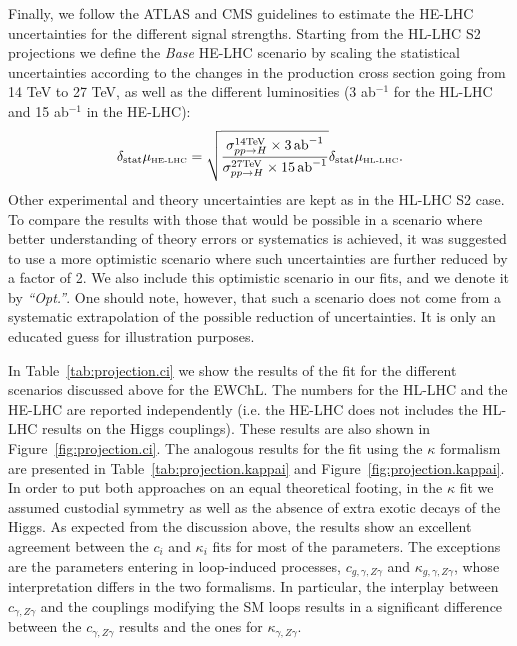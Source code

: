 %
Finally, we follow the ATLAS and CMS guidelines to estimate the HE-LHC uncertainties for the different signal strengths.  
Starting from the HL-LHC S2 projections we define the {\it Base} HE-LHC scenario by scaling the statistical uncertainties according to the changes in the production cross section going from 14 TeV to 27 TeV, as well as the different luminosities (3 ab$^{-1}$ for the HL-LHC and 15 ab$^{-1}$ in the HE-LHC):
%
\begin{equation}
\delta_{\mathrm{stat}} \mu_{\mbox{\tiny HE-LHC}} = \sqrt{\frac{\sigma_{pp\to H}^{\mathrm{14 TeV}}\times 3~\!\mathrm{ab}^{-1}}{\sigma_{pp\to H}^{\mathrm{27 TeV}}\times 15~\! \mathrm{ab}^{-1}}} \delta_{\mathrm{stat}} \mu_{\mbox{\tiny HL-LHC}} .
\end{equation}
%
Other experimental and theory uncertainties are kept as in the HL-LHC S2 case. 
To compare the results with those that would be possible in a scenario where better understanding of theory errors or systematics is achieved, it was suggested to use a more optimistic scenario where such uncertainties are further reduced by a factor of 2. We also include this optimistic scenario in our fits, and we denote it by {\it ``Opt.''}. One should note, however, that such a scenario does not come from a systematic extrapolation of the possible reduction of uncertainties. It is only an educated guess for illustration purposes.
\vspace{1cm}
 

In Table~\ref{tab:projection.ci} we show the results of the fit for the different scenarios discussed above for the EWChL. The numbers for the HL-LHC and the HE-LHC are reported independently (i.e. the HE-LHC does not includes the HL-LHC results on the Higgs couplings). %
These results are also shown in Figure~\ref{fig:projection.ci}. 
The analogous results for the fit using the $\kappa$ formalism are presented in Table~\ref{tab:projection.kappai} and Figure~\ref{fig:projection.kappai}. In order to put both approaches on an equal theoretical footing, in the $\kappa$ fit we assumed custodial symmetry as well as the absence of extra exotic decays of the Higgs.  As expected from the discussion above, the results show an excellent agreement between the $c_i$ and $\kappa_i$ fits for most of the parameters. The exceptions are the parameters entering in loop-induced processes, $c_{g,\gamma,Z\gamma}$ and $\kappa_{g,\gamma,Z\gamma}$, whose interpretation differs in the two formalisms. In particular, the interplay between $c_{\gamma,Z\gamma}$ and the couplings modifying the SM loops results in a significant difference between the $c_{\gamma,Z\gamma}$ results and the ones for $\kappa_{\gamma,Z\gamma}$.

